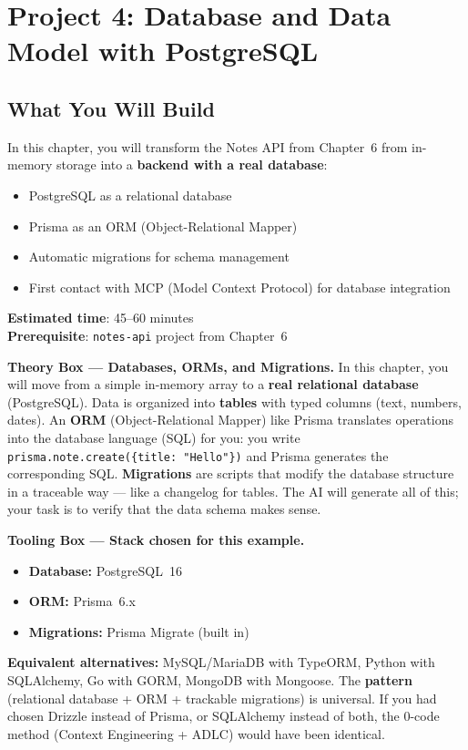 \chapter{Project 4: Database and Data Model with PostgreSQL}

\section*{What You Will Build}
In this chapter, you will transform the Notes API from Chapter~6 from in-memory storage into a \textbf{backend with a real database}:
\begin{itemize}
  \item PostgreSQL as a relational database
  \item Prisma as an ORM (Object-Relational Mapper)
  \item Automatic migrations for schema management
  \item First contact with MCP (Model Context Protocol) for database integration
\end{itemize}

\textbf{Estimated time}: 45--60 minutes\\
\textbf{Prerequisite}: \texttt{notes-api} project from Chapter~6

\begin{notebox}
\textbf{Theory Box --- Databases, ORMs, and Migrations.} In this chapter, you will move from a simple in-memory array to a \textbf{real relational database} (PostgreSQL). Data is organized into \textbf{tables} with typed columns (text, numbers, dates). An \textbf{ORM} (Object-Relational Mapper) like Prisma translates operations into the database language (SQL) for you: you write \texttt{prisma.note.create(\{title: "Hello"\})} and Prisma generates the corresponding SQL. \textbf{Migrations} are scripts that modify the database structure in a traceable way --- like a changelog for tables. The AI will generate all of this; your task is to verify that the data schema makes sense.
\end{notebox}

\begin{notebox}
\textbf{Tooling Box --- Stack chosen for this example.}
\begin{itemize}
  \item \textbf{Database:} PostgreSQL~16
  \item \textbf{ORM:} Prisma~6.x
  \item \textbf{Migrations:} Prisma Migrate (built in)
\end{itemize}
\textbf{Equivalent alternatives:} MySQL/MariaDB with TypeORM, Python with SQLAlchemy, Go with GORM, MongoDB with Mongoose. The \textbf{pattern} (relational database + ORM + trackable migrations) is universal. If you had chosen Drizzle instead of Prisma, or SQLAlchemy instead of both, the 0-code method (Context Engineering + ADLC) would have been identical.
\end{notebox}

